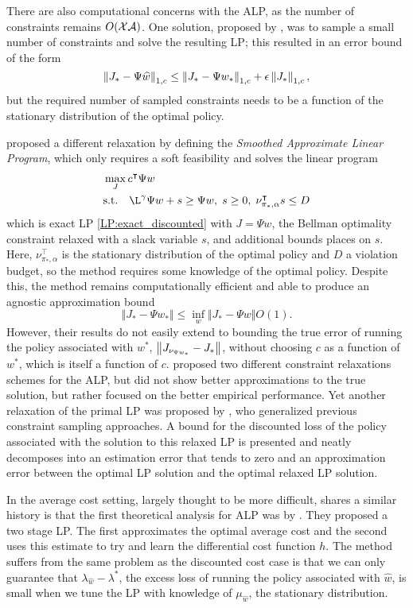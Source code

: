 \documentclass[11pt]{article}
\begin{document}
There are also computational concerns with the ALP, as the number of constraints remains $O({\cal X}{\cal A})$. One solution, proposed by \cite{DeFarias-VanRoy-2004}, was to sample a small number of constraints and solve the resulting LP; this resulted in an error bound of the form
\[
  \left\Vert J_* - \Psi \widehat w\right\Vert_{1,c} \le \left\Vert J_* - \Psi  w_*\right\Vert_{1,c} + \epsilon \left\Vert J_*\right\Vert_{1,c},
\]
but the required number of sampled constraints needs to be a function of the stationary distribution of the optimal policy.

\cite{Desai-Farias-Moallemi-2012} proposed a different relaxation by defining the \emph{Smoothed Approximate Linear Program}, which only requires a soft feasibility and solves the linear program
\begin{align*}
&\max_{J} c^\top \Psi w\\
\notag
&\mbox{s.t.}\quad \L^\gamma \Psi w + s \geq \Psi w,\; s \geq 0, \;\nu^\top_{\pi_{*},\alpha} s\leq D
\end{align*}
which is exact LP \eqref{LP:exact_discounted} with $J = \Psi w$, the Bellman optimality constraint relaxed with a slack variable $s$, and additional bounds places on $s$. Here, $\nu^\top_{\pi_{*},\alpha}$ is the stationary distribution of the optimal policy and $D$ a violation budget, so the method requires some knowledge of the optimal policy. Despite this, the method remains computationally efficient and able to produce an agnostic approximation bound
\[
  \Vert J_* - \Psi w_*\Vert \leq \inf_w \Vert J_* - \Psi w\Vert O(1).
\]
However, their results do not easily extend to bounding the true error of running the policy associated with $w^*$, $\left\Vert J_{\nu_{\Psi w_*}}-J_*\right\Vert$, without choosing $c$ as a function of $w^*$, which is itself a function of $c$. \cite{Petrik-Zilberstein-2009} proposed two different constraint relaxations schemes for the ALP, but did not show better approximations to the true solution, but rather focused on the better empirical performance. Yet another relaxation of the primal LP was proposed by \cite{lakshminarayanan2018linearly}, who generalized previous constraint sampling approaches. A bound for the discounted loss of the policy associated with the solution to this relaxed LP is presented and neatly decomposes into an estimation error that tends to zero and an approximation error between the optimal LP solution and the optimal relaxed LP solution. 


In the average cost setting, largely thought to be more difficult, shares a similar history is that the first theoretical analysis for ALP was by \cite{deFarias-VanRoy-NIPS-2003}. They proposed a two stage LP. The first  approximates the optimal average cost and the second uses this estimate to try and learn the differential cost function $h$. The method suffers from the same problem as the discounted cost case is that we can only guarantee that $\lambda_{\hat w} - \lambda^*$, the excess loss of running the policy associated with $\hat w$, is small when we tune the LP with knowledge of $\mu_{\hat w}$, the stationary distribution.
\end{document}
